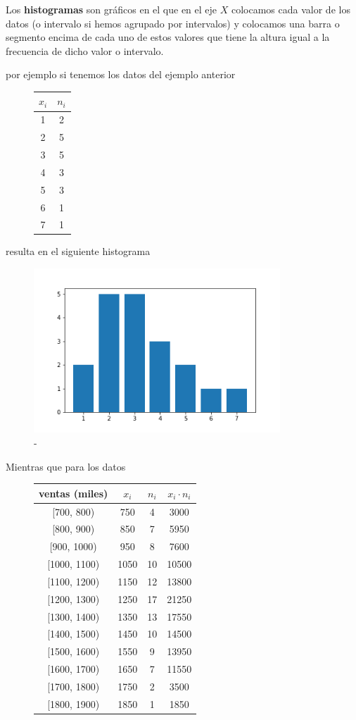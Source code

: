 \documentclass[]{article}
\theoremstyle{plain}
\theoremstyle{definition}
\theoremstyle{definition} %
\begin{document}
Los \textbf{histogramas} son gráficos en el que en el eje \(X\)
colocamos cada valor de los datos (o intervalo si hemos agrupado por
intervalos) y colocamos una barra o segmento encima de cada uno de estos
valores que tiene la altura igual a la frecuencia de dicho valor o
intervalo.

por ejemplo si tenemos los datos del ejemplo anterior

\begin{figure}
  \centering
  \begin{tabular}{cc}
  \(x_i\) & \(n_i\)\\
  \hline
  1 & 2\\
  2 & 5\\
  3 & 5\\
  4 & 3\\
  5 & 3\\
  6 & 1\\
  7 & 1\\
  \end{tabular}
\end{figure}

resulta en el siguiente histograma

\begin{figure}
\centering
\includegraphics[width=3.64583in,height=\textheight]{img/histograma.png}
\caption{-}
\end{figure}

Mientras que para los datos

\begin{figure}
  \centering
  \begin{tabular}{cccc}
ventas (miles) & \(x_i\) & \(n_i\) & \(x_i \cdot n_i\)\tabularnewline
\hline
{[}700, 800) & 750 & 4 & 3000     \\
{[}800, 900) & 850 & 7 & 5950     \\
{[}900, 1000) & 950 & 8 & 7600    \\
{[}1000, 1100) & 1050 & 10 & 10500\\
{[}1100, 1200) & 1150 & 12 & 13800\\
{[}1200, 1300) & 1250 & 17 & 21250\\
{[}1300, 1400) & 1350 & 13 & 17550\\
{[}1400, 1500) & 1450 & 10 & 14500\\
{[}1500, 1600) & 1550 & 9 & 13950  \\
{[}1600, 1700) & 1650 & 7 & 11550  \\
{[}1700, 1800) & 1750 & 2 & 3500 \\
{[}1800, 1900) & 1850 & 1 & 1850 
\end{tabular}
\end{figure}
\end{document}
